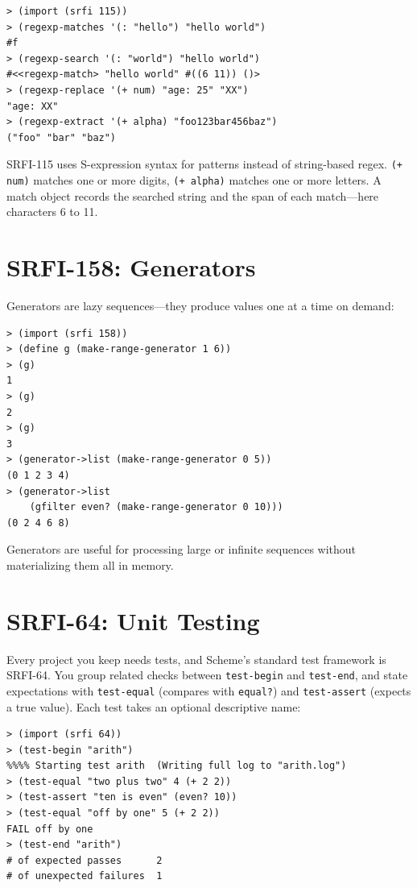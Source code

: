 \begin{lstlisting}[style=repl]
> (import (srfi 115))
> (regexp-matches '(: "hello") "hello world")
#f
> (regexp-search '(: "world") "hello world")
#<<regexp-match> "hello world" #((6 11)) ()>
> (regexp-replace '(+ num) "age: 25" "XX")
"age: XX"
> (regexp-extract '(+ alpha) "foo123bar456baz")
("foo" "bar" "baz")
\end{lstlisting}

SRFI-115 uses S-expression syntax for patterns instead of string-based regex. \texttt{(+ num)} matches one or more digits, \texttt{(+ alpha)} matches one or more letters. A match object records the searched string and the span of each match---here characters 6 to 11.

\section{SRFI-158: Generators}

Generators are lazy sequences---they produce values one at a time on demand:

\begin{lstlisting}[style=repl]
> (import (srfi 158))
> (define g (make-range-generator 1 6))
> (g)
1
> (g)
2
> (g)
3
> (generator->list (make-range-generator 0 5))
(0 1 2 3 4)
> (generator->list
    (gfilter even? (make-range-generator 0 10)))
(0 2 4 6 8)
\end{lstlisting}

Generators are useful for processing large or infinite sequences without materializing them all in memory.

\section{SRFI-64: Unit Testing}

Every project you keep needs tests, and Scheme's standard test framework is SRFI-64. You group related checks between \texttt{test-begin} and \texttt{test-end}, and state expectations with \texttt{test-equal} (compares with \texttt{equal?}) and \texttt{test-assert} (expects a true value). Each test takes an optional descriptive name:

\begin{lstlisting}[style=repl]
> (import (srfi 64))
> (test-begin "arith")
%%%% Starting test arith  (Writing full log to "arith.log")
> (test-equal "two plus two" 4 (+ 2 2))
> (test-assert "ten is even" (even? 10))
> (test-equal "off by one" 5 (+ 2 2))
FAIL off by one
> (test-end "arith")
# of expected passes      2
# of unexpected failures  1
\end{lstlisting}

